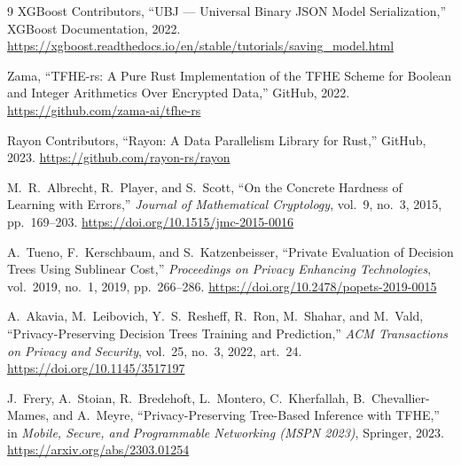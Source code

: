 \documentclass[12pt]{article}
\begin{document}
\begin{thebibliography}{9}
XGBoost Contributors,
``UBJ --- Universal Binary JSON Model Serialization,''
XGBoost Documentation, 2022.
\url{https://xgboost.readthedocs.io/en/stable/tutorials/saving_model.html}

Zama,
``TFHE-rs: A Pure Rust Implementation of the TFHE Scheme for Boolean and Integer Arithmetics Over Encrypted Data,''
GitHub, 2022.
\url{https://github.com/zama-ai/tfhe-rs}

Rayon Contributors,
``Rayon: A Data Parallelism Library for Rust,''
GitHub, 2023.
\url{https://github.com/rayon-rs/rayon}

M.\ R.\ Albrecht, R.\ Player, and S.\ Scott,
``On the Concrete Hardness of Learning with Errors,''
\textit{Journal of Mathematical Cryptology}, vol.\ 9, no.\ 3, 2015, pp.\ 169--203.
\url{https://doi.org/10.1515/jmc-2015-0016}

A.\ Tueno, F.\ Kerschbaum, and S.\ Katzenbeisser,
``Private Evaluation of Decision Trees Using Sublinear Cost,''
\textit{Proceedings on Privacy Enhancing Technologies}, vol.\ 2019, no.\ 1, 2019, pp.\ 266--286.
\url{https://doi.org/10.2478/popets-2019-0015}

A.\ Akavia, M.\ Leibovich, Y.\ S.\ Resheff, R.\ Ron, M.\ Shahar, and M.\ Vald,
``Privacy-Preserving Decision Trees Training and Prediction,''
\textit{ACM Transactions on Privacy and Security}, vol.\ 25, no.\ 3, 2022, art.\ 24.
\url{https://doi.org/10.1145/3517197}

J.\ Frery, A.\ Stoian, R.\ Bredehoft, L.\ Montero, C.\ Kherfallah, B.\ Chevallier-Mames, and A.\ Meyre,
``Privacy-Preserving Tree-Based Inference with TFHE,''
in \textit{Mobile, Secure, and Programmable Networking (MSPN 2023)}, Springer, 2023.
\url{https://arxiv.org/abs/2303.01254}

\end{thebibliography}
\end{document}
